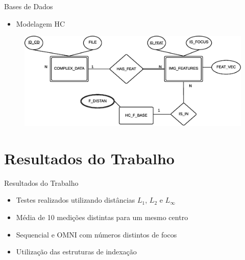 \documentclass{beamer}
\begin{document}
\begin{frame}{Bases de Dados}
  \begin{itemize}
   \item Modelagem HC
  \end{itemize}
  \begin{figure}[H]
      \centering
      \includegraphics[width=.9\textwidth]{dados/figuras/mer_hc.eps}
  \end{figure}
\end{frame}

\section{Resultados do Trabalho}

\begin{frame}{Resultados do Trabalho}
  \begin{itemize}
   \item Testes realizados utilizando distâncias $L_1$, $L_2$ e $L_\infty$\newline
   \item Média de 10 medições distintas para um mesmo centro\newline
   \item Sequencial e OMNI com números distintos de focos\newline
   \item Utilização das estruturas de indexação\newline
  \end{itemize}
\end{frame}
\end{document}
